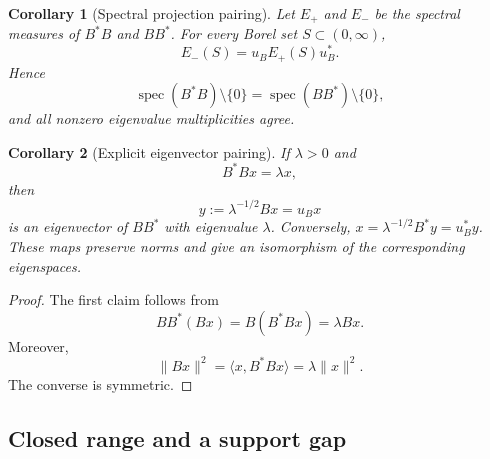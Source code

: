 \documentclass[11pt,reqno]{scrartcl}
\newcommand{\inner}[2]{\langle #1,#2\rangle}
\DeclareMathOperator{\spec}{spec}
\theoremstyle{plain}
\newtheorem{corollary}[corollary]{Corollary}
\theoremstyle{definition}
\theoremstyle{remark}
\begin{document}
\begin{corollary}[Spectral projection pairing]
\label{cor:spectral-projection-pairing}
Let \(E_+\) and \(E_-\) be the spectral measures of \(B^*B\) and \(BB^*\).
For every Borel set \(S\subset(0,\infty)\),
\begin{equation}
  E_-(S)=u_BE_+(S)u_B^*.
  \label{eq:spectral-projection-pairing}
\end{equation}
Hence
\begin{equation}
  \spec(B^*B)\setminus\{0\}
  =\spec(BB^*)\setminus\{0\},
  \label{eq:nonzero-spectrum}
\end{equation}
and all nonzero eigenvalue multiplicities agree.
\end{corollary}

\begin{corollary}[Explicit eigenvector pairing]
\label{cor:eigenvector-pairing}
If \(\lambda>0\) and
\begin{equation}
  B^*Bx=\lambda x,
\end{equation}
then
\begin{equation}
  y:=\lambda^{-1/2}Bx=u_Bx
\end{equation}
is an eigenvector of \(BB^*\) with eigenvalue \(\lambda\).  Conversely,
\(x=\lambda^{-1/2}B^*y=u_B^*y\).  These maps preserve norms and give an
isomorphism of the corresponding eigenspaces.
\end{corollary}

\begin{proof}
The first claim follows from
\begin{equation}
  BB^*(Bx)=B(B^*Bx)=\lambda Bx.
\end{equation}
Moreover,
\begin{equation}
  \|Bx\|^2=\inner{x}{B^*Bx}=\lambda\|x\|^2.
\end{equation}
The converse is symmetric.
\end{proof}

\subsection{Closed range and a support gap}
\end{document}
